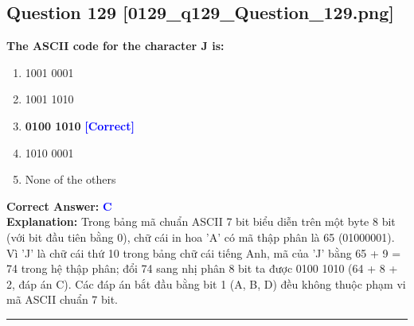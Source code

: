 \documentclass[11pt,a4paper]{article}
\begin{document}
\begin{minipage}{\textwidth}
\subsection*{Question 129 \quad \footnotesize{[0129\_q129\_Question\_129.png]}}
\noindent \textbf{The ASCII code for the character J is:}

\begin{enumerate}[label=\Alph*.]
    \item 1001 0001
    \item 1001 1010
    \item \textbf{0100 1010} \hfill \textcolor{blue}{\textbf{[Correct]}}
    \item 1010 0001
    \item None of the others
\end{enumerate}

\noindent \textbf{Correct Answer:} \textcolor{blue}{\textbf{C}} \\[2pt]
\noindent \textbf{Explanation:} Trong bảng mã chuẩn ASCII 7 bit biểu diễn trên một byte 8 bit (với bit đầu tiên bằng 0), chữ cái in hoa 'A' có mã thập phân là 65 (01000001). Vì 'J' là chữ cái thứ 10 trong bảng chữ cái tiếng Anh, mã của 'J' bằng 65 + 9 = 74 trong hệ thập phân; đổi 74 sang nhị phân 8 bit ta được 0100 1010 (64 + 8 + 2, đáp án C). Các đáp án bắt đầu bằng bit 1 (A, B, D) đều không thuộc phạm vi mã ASCII chuẩn 7 bit.

\par\vspace{0.3cm}
\hrule
\vspace{0.3cm}
\end{minipage}
\end{document}
